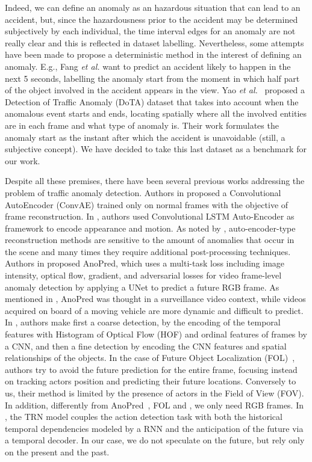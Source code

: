 Indeed, we can define an anomaly as an hazardous situation that can lead to an accident, but, since the hazardousness prior to the accident may be determined subjectively by each individual, the time interval edges for an anomaly are not really clear and this is reflected in dataset labelling.
Nevertheless, some attempts have been made to propose a deterministic method in the interest of defining an anomaly.
E.g., Fang \emph{et al.} \cite{fang2019dada} want to predict an accident likely to happen in the next 5 seconds, labelling the anomaly start from the moment in which half part of the object involved in the accident appears in the view.
Yao \emph{et al.}~\cite{yao2020when} proposed a Detection of Traffic Anomaly (DoTA) dataset that takes into account when the anomalous event starts and ends, locating spatially where all the involved entities are in each frame and what type of anomaly is.
Their work formulates the anomaly start as the instant after which the accident is unavoidable (still, a subjective concept).
We have decided to take this last dataset as a benchmark for our work.

Despite all these premises, there have been several previous works addressing the problem of traffic anomaly detection.
Authors in \cite{hasan2016learning} proposed a Convolutional AutoEncoder (ConvAE) trained only on normal frames with the objective of frame reconstruction.
In \cite{luo2017remembering, wang2018abnormal}, authors used Convolutional LSTM Auto-Encoder as framework to encode appearance and motion.
As noted by \cite{ramachandra2020survey}, auto-encoder-type reconstruction methods are sensitive to the amount of anomalies that occur in the scene and many times they require additional post-processing techniques.
Authors in \cite{liu2018future} proposed AnoPred, which uses a multi-task loss including image intensity, optical flow, gradient, and adversarial losses for video frame-level anomaly detection by applying a UNet to predict a future RGB frame.
As mentioned in \cite{9712446}, AnoPred was thought in a surveillance video context, while videos acquired on board of a moving vehicle are more dynamic and difficult to predict.
In \cite{zhou_spatio-temporal_2022}, authors make first a coarse detection, by the encoding of the temporal features with Histogram of Optical Flow (HOF) \cite{wang2013action} and ordinal features of frames by a CNN, and then a fine detection by encoding the CNN features and spatial relationships of the objects.
In the case of Future Object Localization (FOL)~\cite{9712446}, authors try to avoid the future prediction for the entire frame, focusing instead on tracking actors position and predicting their future locations.
Conversely to us, their method is limited by the presence of actors in the Field of View (FOV).
In addition, differently from AnoPred~\cite{liu2018future}, FOL \cite{9712446} and \cite{zhou_spatio-temporal_2022}, we only need RGB frames.
In \cite{xu2019temporal}, the TRN model couples the action detection task with both the historical temporal dependencies modeled by a RNN and the anticipation of the future via a temporal decoder.
In our case, we do not speculate on the future, but rely only on the present and the past.

